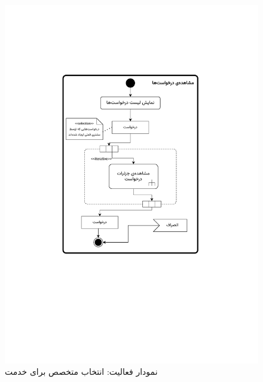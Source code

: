 \begin{figure}[ht!]
	\centering
	\includegraphics[scale=0.8, page=3]{figs/OOD-activity11-20.pdf}
	\caption{نمودار فعالیت: انتخاب متخصص برای خدمت}
\end{figure}
\FloatBarrier
\newpage

